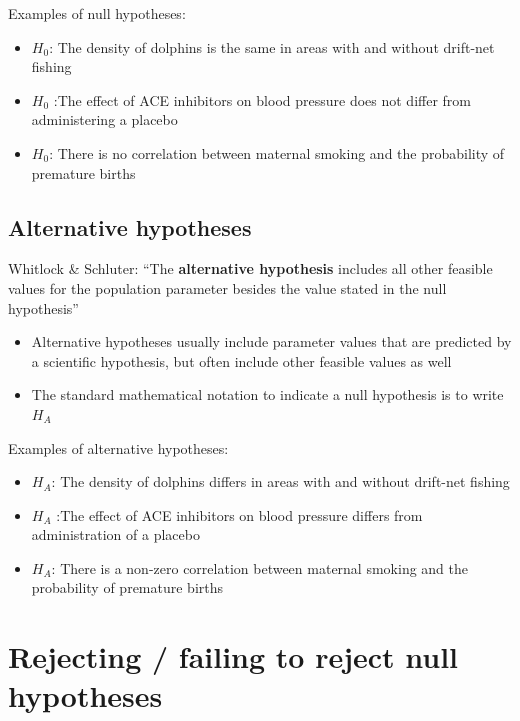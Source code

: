 \documentclass[]{book}
\providecommand{\tightlist}{%
  \setlength{\itemsep}{0pt}\setlength{\parskip}{0pt}}
\theoremstyle{definition}
\theoremstyle{definition}
\theoremstyle{definition}
\theoremstyle{remark}
\begin{document}
Examples of null hypotheses:

\begin{itemize}
\tightlist
\item
  \(H_0\): The density of dolphins is the same in areas with and without
  drift-net fishing
\item
  \(H_0\) :The effect of ACE inhibitors on blood pressure does not
  differ from administering a placebo
\item
  \(H_0\): There is no correlation between maternal smoking and the
  probability of premature births
\end{itemize}

\hypertarget{alternative-hypotheses}{%
\subsection{Alternative hypotheses}\label{alternative-hypotheses}}

Whitlock \& Schluter: ``The \textbf{alternative hypothesis} includes all
other feasible values for the population parameter besides the value
stated in the null hypothesis''

\begin{itemize}
\tightlist
\item
  Alternative hypotheses usually include parameter values that are
  predicted by a scientific hypothesis, but often include other feasible
  values as well
\item
  The standard mathematical notation to indicate a null hypothesis is to
  write \(H_A\)
\end{itemize}

Examples of alternative hypotheses:

\begin{itemize}
\tightlist
\item
  \(H_A\): The density of dolphins differs in areas with and without
  drift-net fishing
\item
  \(H_A\) :The effect of ACE inhibitors on blood pressure differs from
  administration of a placebo
\item
  \(H_A\): There is a non-zero correlation between maternal smoking and
  the probability of premature births
\end{itemize}

\hypertarget{rejecting-failing-to-reject-null-hypotheses}{%
\section{Rejecting / failing to reject null
hypotheses}\label{rejecting-failing-to-reject-null-hypotheses}}
\end{document}
